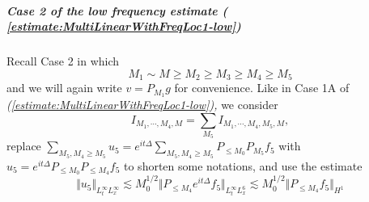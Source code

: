 \documentclass[12pt,letterpaper,leqno]{amsart}
\theoremstyle{plain}
\numberwithin{equation}{section}
\numberwithin{theorem}{section}
\numberwithin{proposition}{section}
\numberwithin{lemma}{section}
\numberwithin{corollary}{section}
\begin{document}
\subparagraph{\noindent \textit{Case 2 of the low frequency estimate (%
\protect\ref{estimate:MultiLinearWithFreqLoc1-low})}}

Recall Case 2 in which 
\begin{equation*}
M_{1}\sim M\geq M_{2}\geq M_{3}\geq M_{4}\geq M_{5}
\end{equation*}%
and we will again write $v=P_{M_{1}}g$ for convenience. Like in Case 1A of 
\textit{(\ref{estimate:MultiLinearWithFreqLoc1-low}), }we consider%
\begin{equation*}
I_{M_{1},\cdots ,M_{4},M}=\sum_{M_{5}}I_{M_{1},\cdots ,M_{4},M_{5},M},
\end{equation*}%
replace $\sum_{M_{5},M_{4}\geq M_{5}}u_{5}=e^{it\Delta
}\sum_{M_{5},M_{4}\geq M_{5}}P_{\leq M_{0}}P_{M_{5}}f_{5}$ with $%
u_{5}=e^{it\Delta }P_{\leq M_{0}}P_{\leq M_{4}}f_{5}$ to shorten some
notations, and use the estimate 
\begin{equation*}
\Vert u_{5}\Vert _{L_{t}^{\infty }L_{x}^{\infty }}\lesssim M_{0}^{1/2}\Vert
P_{\leq M_{4}}e^{it\Delta }f_{5}\Vert _{L_{t}^{\infty }L_{x}^{6}}\lesssim
M_{0}^{1/2}\Vert P_{\leq M_{4}}f_{5}\Vert _{H^{1}}
\end{equation*}
\end{document}
